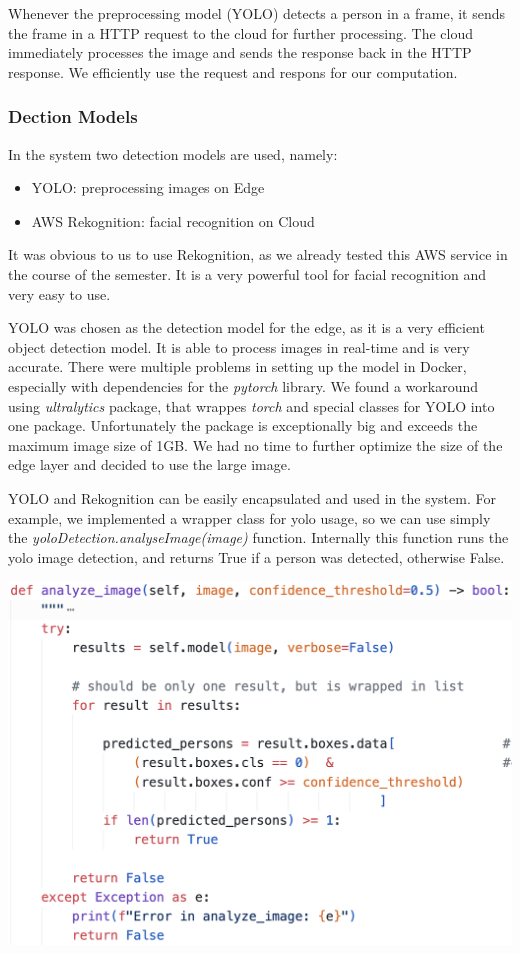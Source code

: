 \documentclass[conference]{IEEEtran}
\begin{document}
Whenever the preprocessing model (YOLO) detects a person in a frame, it sends the frame in a HTTP request to the cloud for further processing. 
The cloud immediately processes the image and sends the response back in the HTTP response. We efficiently use the request and respons for our computation. 
\hfill \break

\subsubsection{Dection Models}
In the system two detection models are used, namely: 
\begin{itemize}
\item YOLO: preprocessing images on Edge
\item AWS Rekognition: facial recognition on Cloud
\end{itemize}

\hfill \break

It was obvious to us to use Rekognition, as we already tested this AWS service in the course of the semester. It is a very powerful tool for facial recognition and very easy to use. 

YOLO was chosen as the detection model for the edge, as it is a very efficient object detection model. It is able to process images in real-time and is very accurate. There were multiple problems in setting up the model in Docker, especially with dependencies for the \textit{pytorch} library. We found a workaround using \textit{ultralytics} package, that wrappes \textit{torch} and special classes for YOLO into one package. Unfortunately the package is exceptionally big and exceeds the maximum image size of 1GB. We had no time to further optimize the size of the edge layer and decided to use the large image. 

YOLO and Rekognition can be easily encapsulated and used in the system. 
For example, we implemented a wrapper class for yolo usage, so we can use simply the \textit{yoloDetection.analyseImage(image)} function. 
Internally this function runs the yolo image detection, and returns True if a person was detected, otherwise False. 

\begin{center}
\includegraphics[width=1\linewidth]{res/analyze_image-function.png}
\end{center}
\end{document}
